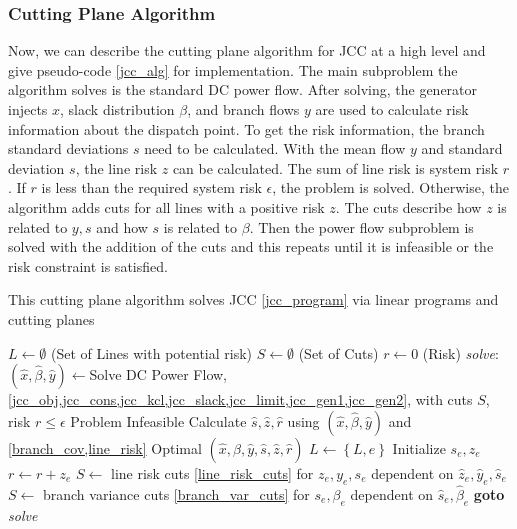 \subsubsection*{Cutting Plane Algorithm}
Now, we can describe the cutting plane algorithm for JCC at a high level and give pseudo-code \ref{jcc_alg} for implementation.  The main subproblem the algorithm solves is the standard DC power flow.  After solving, the generator injects $x$, slack distribution $\beta$, and branch flows $y$ are used to calculate risk information about the dispatch point.  To get the risk information, the branch standard deviations $s$ need to be calculated.  With the mean flow $y$ and standard deviation $s$, the line risk $z$ can be calculated.  The sum of line risk is system risk $r$.  If $r$ is less than the required system risk $\epsilon$, the problem is solved.  Otherwise, the algorithm adds cuts for all lines with a positive risk $z$.  The cuts describe how $z$ is related to $y,s$ and how $s$ is related to $\beta$.  Then the power flow subproblem is solved with the addition of the cuts and this repeats until it is infeasible or the risk constraint is satisfied.
\begin{algorithm}
\caption{This cutting plane algorithm solves JCC \ref{jcc_program} via linear programs and cutting planes}\label{jcc_alg}
\begin{algorithmic}
\State $L \gets \emptyset$  (Set of Lines with potential risk)
\State $S \gets \emptyset$  (Set of Cuts)
\State $r \gets 0$ (Risk)
\BState \emph{solve}:
\State $(\hat{x},\hat{\beta},\hat{y}) \gets $Solve DC Power Flow, \cref{jcc_obj,jcc_cons,jcc_kcl,jcc_slack,jcc_limit,jcc_gen1,jcc_gen2}, with cuts $S$, risk $r\leq\epsilon$
 \Return Problem Infeasible 
\EndIf
\State Calculate $\hat{s},\hat{z},\hat{r}$ using $(\hat{x},\hat{\beta},\hat{y})$ and \cref{branch_cov,line_risk}
 \Return Optimal $(\hat{x},\hat{\beta},\hat{y},\hat{s},\hat{z},\hat{r})$
\EndIf
{}
            \State $L \gets \left\{L,e\right\}$
            \State Initialize $s_e,z_e$
            \State $r \gets r + z_e$
    \EndIf            
    \State $S \gets$ line risk cuts \ref{line_risk_cuts} for $z_e,y_e,s_e$ dependent on $\hat{z}_e,\hat{y}_e,\hat{s}_e$
    \State $S \gets$ branch variance cuts \ref{branch_var_cuts} for $s_e,\beta_e$ dependent on $\hat{s}_e,\hat{\beta}_e$
\EndIf
\EndFor
\State \textbf{goto} \emph{solve}
\EndProcedure
\end{algorithmic}
\end{algorithm}





